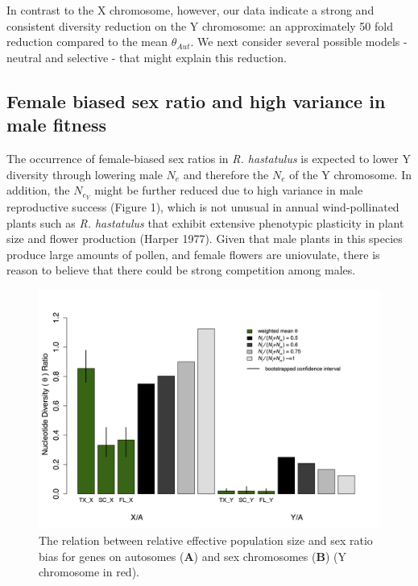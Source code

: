 \documentclass[9pt,twocolumn,twoside]{gsajnl}
\begin{document}
In contrast to the X chromosome, however, our data indicate a strong and consistent diversity reduction on the Y chromosome: an approximately 50 fold reduction compared to the mean $\theta_{Aut}$. We next consider several possible models - neutral and selective - that might explain this reduction.

\subsection*{Female biased sex ratio and high variance in male fitness}

The occurrence of female-biased sex ratios in \textit{R. hastatulus} is expected to lower Y diversity through lowering male $N_{e}$ and therefore the $N_{e}$ of the Y chromosome. In addition, the $N_{e}_{Y}$ might be further reduced due to high variance in male reproductive success (Figure 1), which is not unusual in annual wind-pollinated plants such as \textit{R. hastatulus} that exhibit extensive phenotypic plasticity in plant size and flower production (\X Harper 1977). Given that male plants in this species produce large amounts of pollen, and female flowers are uniovulate, there is reason to believe that there could be strong competition among males.



\begin{figure}[htbp]
\centering
\noindent
\includegraphics[width=\linewidth]{figure2.jpg}
\caption{The relation between relative effective population size and sex ratio bias for genes on autosomes (\textbf{A}) and sex chromosomes (\textbf{B}) (Y chromosome in red).
}
\label{fig:spectrum}
\end{figure}
\end{document}
